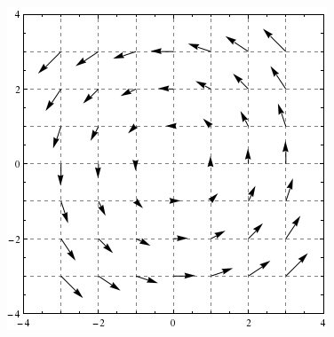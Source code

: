 \documentclass{ximera}
\begin{document}
\begin{image}
  \includegraphics{rotField.png}
\end{image}
\end{document}
